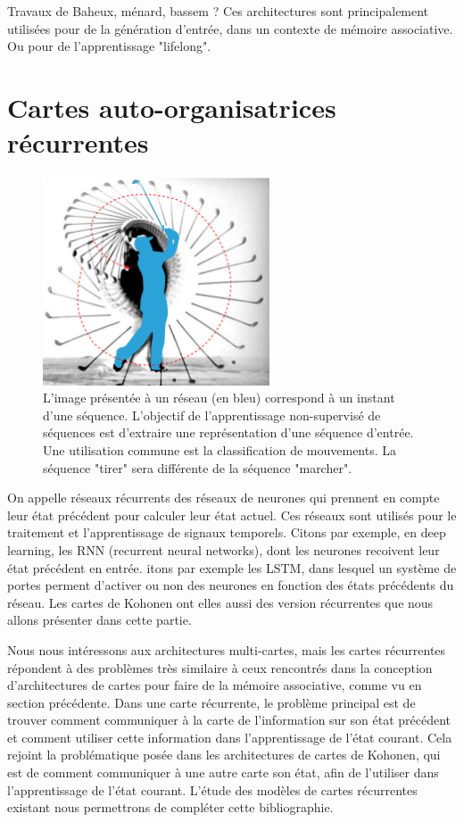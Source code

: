 \documentclass[../main]{subfiles}
\begin{document}
Travaux de Baheux, ménard, bassem ? 
Ces architectures sont principalement utilisées pour de la génération d'entrée, dans un contexte de mémoire associative. Ou pour de l'apprentissage "lifelong".

\section{Cartes auto-organisatrices récurrentes}

\begin{figure}
   \centering\includegraphics[width=0.6\textwidth]{movment_002.pdf}
   \caption{L'image présentée à un réseau (en bleu) correspond à un instant d'une séquence. L'objectif de l'apprentissage non-supervisé de séquences est d'extraire une représentation d'une séquence d'entrée. Une utilisation commune est la classification de mouvements. La séquence "tirer" sera différente de la séquence "marcher".\label{fig:mouvement}}
\end{figure}

On appelle réseaux récurrents des réseaux de neurones qui prennent en compte leur état précédent pour calculer leur état actuel. Ces réseaux sont utilisés pour le traitement et l'apprentissage de signaux temporels. Citons par exemple, en deep learning, les RNN (recurrent neural networks), dont les neurones recoivent leur état précédent en entrée. itons par exemple les LSTM, dans lesquel un système de portes perment d'activer ou non des neurones en fonction des états précédents du réseau. Les cartes de Kohonen ont elles aussi des version récurrentes que nous allons présenter dans cette partie.

Nous nous intéressons aux architectures multi-cartes, mais les cartes récurrentes répondent à des problèmes très similaire à ceux rencontrés dans la conception d'architectures de cartes pour faire de la mémoire associative, comme vu en section précédente.
Dans une carte récurrente, le problème principal est de trouver comment communiquer à la carte de l'information sur son état précédent et comment utiliser cette information dans l'apprentissage de l'état courant. Cela rejoint la problématique posée dans les architectures de cartes de Kohonen, qui est de comment communiquer à une autre carte son état, afin de l'utiliser dans l'apprentissage de l'état courant. L'étude des modèles de cartes récurrentes existant nous permettrons de compléter cette bibliographie. 
\end{document}
